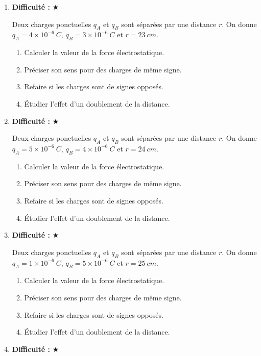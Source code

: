 \documentclass[11pt,a4paper]{article}
\newcommand{\etoiles}[1]{\textbf{Difficulté : }#1}
\begin{document}
\begin{enumerate}[label=\textbf{Exercice \arabic*.},leftmargin=*]
Deux charges ponctuelles $q_A$ et $q_B$ sont séparées par une distance $r$.
On donne $q_A=3\times 10^{-6}\ \si{C}$, $q_B=2\times 10^{-6}\ \si{C}$ et $r=22\ \si{cm}$.
\begin{enumerate}[label=\alph*)]
\item Calculer la valeur de la force électrostatique.
\item Préciser son sens pour des charges de même signe.
\item Refaire si les charges sont de signes opposés.
\item Étudier l'effet d'un doublement de la distance.
\end{enumerate}
\item \etoiles{★}

Deux charges ponctuelles $q_A$ et $q_B$ sont séparées par une distance $r$.
On donne $q_A=4\times 10^{-6}\ \si{C}$, $q_B=3\times 10^{-6}\ \si{C}$ et $r=23\ \si{cm}$.
\begin{enumerate}[label=\alph*)]
\item Calculer la valeur de la force électrostatique.
\item Préciser son sens pour des charges de même signe.
\item Refaire si les charges sont de signes opposés.
\item Étudier l'effet d'un doublement de la distance.
\end{enumerate}
\item \etoiles{★}

Deux charges ponctuelles $q_A$ et $q_B$ sont séparées par une distance $r$.
On donne $q_A=5\times 10^{-6}\ \si{C}$, $q_B=4\times 10^{-6}\ \si{C}$ et $r=24\ \si{cm}$.
\begin{enumerate}[label=\alph*)]
\item Calculer la valeur de la force électrostatique.
\item Préciser son sens pour des charges de même signe.
\item Refaire si les charges sont de signes opposés.
\item Étudier l'effet d'un doublement de la distance.
\end{enumerate}
\item \etoiles{★}

Deux charges ponctuelles $q_A$ et $q_B$ sont séparées par une distance $r$.
On donne $q_A=1\times 10^{-6}\ \si{C}$, $q_B=5\times 10^{-6}\ \si{C}$ et $r=25\ \si{cm}$.
\begin{enumerate}[label=\alph*)]
\item Calculer la valeur de la force électrostatique.
\item Préciser son sens pour des charges de même signe.
\item Refaire si les charges sont de signes opposés.
\item Étudier l'effet d'un doublement de la distance.
\end{enumerate}
\item \etoiles{★}


\end{enumerate}
\end{document}
